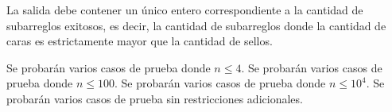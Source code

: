 \documentclass{oci}
\begin{document}
\begin{outputDescription}
La salida debe contener un único entero correspondiente a la cantidad
de subarreglos exitosos, es decir, la cantidad de subarreglos donde
la cantidad de caras es estrictamente mayor que la cantidad de sellos.
\end{outputDescription}

\begin{scoreDescription}
	 Se probarán varios casos de prueba donde $n \leq 4$.
	 Se probarán varios casos de prueba donde $n \leq 100$.
  	 Se probarán varios casos de prueba donde $n \leq 10^4$.
	 Se probarán varios casos de prueba sin restricciones adicionales.
\end{scoreDescription}

\begin{sampleDescription}
\end{sampleDescription}
\end{document}
